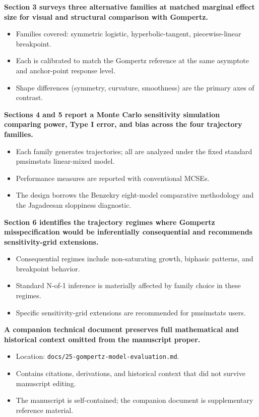 \documentclass[
  11pt,
]{article}
\begin{document}
\textbf{Section 3 surveys three alternative families at matched
marginal effect size for visual and structural comparison with
Gompertz.}

\begin{itemize}\setlength{\itemsep}{2pt}\setlength{\parskip}{0pt}
\item Families covered: symmetric logistic, hyperbolic-tangent,
  piecewise-linear breakpoint.
\item Each is calibrated to match the Gompertz reference at the
  same asymptote and anchor-point response level.
\item Shape differences (symmetry, curvature, smoothness) are
  the primary axes of contrast.
\end{itemize}

\textbf{Sections 4 and 5 report a Monte Carlo sensitivity
simulation comparing power, Type I error, and bias across the
four trajectory families.}

\begin{itemize}\setlength{\itemsep}{2pt}\setlength{\parskip}{0pt}
\item Each family generates trajectories; all are analyzed
  under the fixed standard pmsimstats linear-mixed model.
\item Performance measures are reported with conventional MCSEs.
\item The design borrows the Benzekry eight-model comparative
  methodology and the Jagadeesan sloppiness diagnostic.
\end{itemize}

\textbf{Section 6 identifies the trajectory regimes where
Gompertz misspecification would be inferentially consequential
and recommends sensitivity-grid extensions.}

\begin{itemize}\setlength{\itemsep}{2pt}\setlength{\parskip}{0pt}
\item Consequential regimes include non-saturating growth,
  biphasic patterns, and breakpoint behavior.
\item Standard N-of-1 inference is materially affected by
  family choice in these regimes.
\item Specific sensitivity-grid extensions are recommended for
  pmsimstats users.
\end{itemize}

\textbf{A companion technical document preserves full
mathematical and historical context omitted from the manuscript
proper.}

\begin{itemize}\setlength{\itemsep}{2pt}\setlength{\parskip}{0pt}
\item Location: \texttt{docs/25-gompertz-model-evaluation.md}.
\item Contains citations, derivations, and historical context
  that did not survive manuscript editing.
\item The manuscript is self-contained; the companion document
  is supplementary reference material.
\end{itemize}
\end{document}
